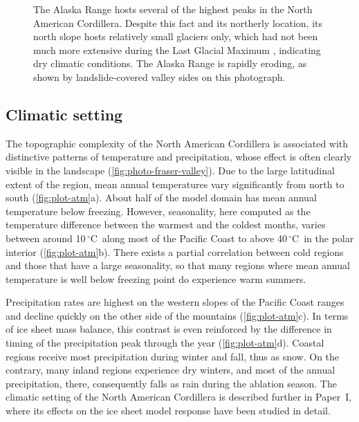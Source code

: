 \documentclass{article}
\newcommand{\unit}[1]{\ensuremath{\mathrm{#1}}}
\newcommand{\degree}[0]{\ensuremath{^{\circ}}}
\newcommand{\degC}[0]{\unit{{\degree}C}}
\newcommand{\CCLI}[0]{Paper~I}      %
\begin{document}
\begin{figure}
  \centering
  \caption{The Alaska Range hosts several of the highest peaks in the North
           American Cordillera. Despite this fact and its northerly location,
           its north slope hosts relatively small glaciers only, which had not
           been much more extensive during the Last Glacial Maximum
           \citep{Kaufman.Manley.2004}, indicating dry climatic conditions.
           The Alaska Range is rapidly eroding, as shown by landslide-covered
           valley sides on this photograph.}
  \label{fig:photo-alaska-range}
\end{figure}

\subsection{Climatic setting}

The topographic complexity of the North American Cordillera is associated with
distinctive patterns of temperature and precipitation, whose effect is often
clearly visible in the landscape (\cref{fig:photo-fraser-valley}). Due to the
large latitudinal extent of the region, mean annual temperatures vary
significantly from north to south (\cref{fig:plot-atm}a). About half of the
model domain has mean annual temperature below freezing. However, seasonality,
here computed as the temperature difference between the warmest and the coldest
months, varies between around 10\,\degC\ along most of the Pacific Coast to
above 40\,\degC\ in the polar interior (\cref{fig:plot-atm}b). There exists a
partial correlation between cold regions and those that have a large
seasonality, so that many regions where mean annual temperature is well below
freezing point do experience warm summers.

Precipitation rates are highest on the western slopes of the Pacific Coast
ranges and decline quickly on the other side of the mountains
(\cref{fig:plot-atm}c). In terms of ice sheet mass balance, this contrast is
even reinforced by the difference in timing of the precipitation peak through
the year (\cref{fig:plot-atm}d). Coastal regions receive most precipitation
during winter and fall, thus as snow. On the contrary, many inland regions
experience dry winters, and most of the annual precipitation, there,
consequently falls
as rain during the ablation season. The climatic setting of the North American
Cordillera is described further in \CCLI, where its effects on the ice sheet
model response have been studied in detail.
\end{document}
